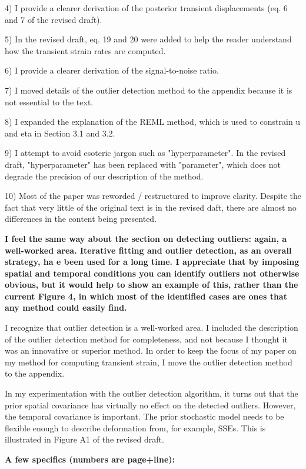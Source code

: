 \documentclass[10pt,a4paper]{letter}
\begin{document}
\begin{letter}{}
  4) I provide a clearer derivation of the posterior transient
     displacements (eq. 6 and 7 of the revised draft). 
  
  5) In the revised draft, eq. 19 and 20 were added to help the reader
     understand how the transient strain rates are computed.

  6) I provide a clearer derivation of the signal-to-noise ratio.
  
  7) I moved details of the outlier detection method to the appendix
     because it is not essential to the text.

  8) I expanded the explanation of the REML method, which is used to
     constrain u and eta in Section 3.1 and 3.2.

  9) I attempt to avoid esoteric jargon such as "hyperparameter". In
     the revised draft, "hyperparameter" has been replaced with
     "parameter", which does not degrade the precision of our
     description of the method.
  
  10) Most of the paper was reworded / restructured to improve
     clarity. Despite the fact that very little of the original text
     is in the revised daft, there are almost no differences in the
     content being presented.
 

\textbf{I feel the same way about the section on detecting outliers: again, a
well-worked area. Iterative fitting and outlier detection, as an
overall strategy, ha e been used for a long time. I appreciate that
by imposing spatial and temporal conditions you can identify outliers
not otherwise obvious, but it would help to show an example of this,
rather than the current Figure 4, in which most of the identified
cases are ones that any method could easily find.}

I recognize that outlier detection is a well-worked area. I included
the description of the outlier detection method for completeness, and
not because I thought it was an innovative or superior method. In
order to keep the focus of my paper on my method for computing
transient strain, I move the outlier detection method to the appendix.

In my experimentation with the outlier detection algorithm, it turns
out that the prior spatial covariance has virtually no effect on the
detected outliers. However, the temporal covariance is important. The
prior stochastic model needs to be flexible enough to describe
deformation from, for example, SSEs. This is illustrated in Figure A1
of the revised draft.

\textbf{A few specifics (numbers are page+line):}


\end{letter}
\end{document}
